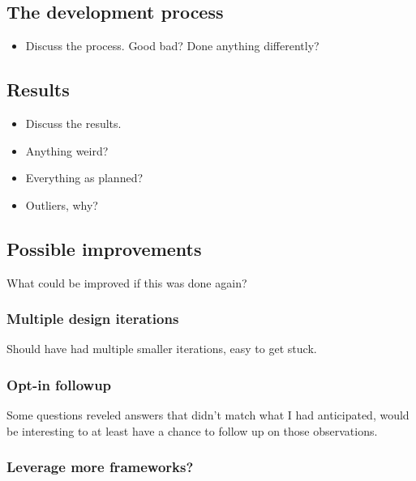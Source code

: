 \documentclass[nofilelist,dvipsnames]{cslthse-msc}
\begin{document}
      \subsection{The development process}


        \begin{itemize}
          \item{Discuss the process. Good bad? Done anything differently?}
        \end{itemize}

      \subsection{Results}

        \begin{itemize}
          \item{Discuss the results.}
          \item{Anything weird?}
          \item{Everything as planned?}
          \item{Outliers, why?}
        \end{itemize}

			\subsection{Possible improvements}

        What could be improved if this was done again?

        \subsubsection{Multiple design iterations}

          Should have had multiple smaller iterations, easy to get stuck.

        \subsubsection{Opt-in followup}

          Some questions reveled answers that didn't match what I had
          anticipated, would be interesting to at least have a chance to follow
          up on those observations.

        \subsubsection{Leverage more frameworks?}
\end{document}
